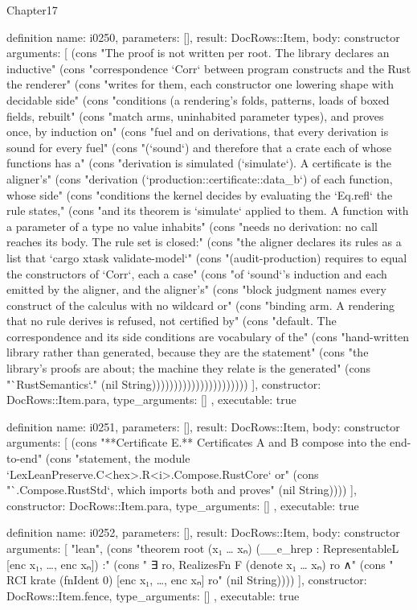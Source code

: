 \begin{lexlean}{Chapter17}
\begin{semanticmodule}
definition{
  name: i0250,
  parameters: [],
  result: DocRows::Item,
  body: constructor{
    arguments: [
      (cons "The proof is not written per root. The library declares an inductive" (cons "correspondence `Corr` between program constructs and the Rust the renderer" (cons "writes for them, each constructor one lowering shape with decidable side" (cons "conditions (a rendering's folds, patterns, loads of boxed fields, rebuilt" (cons "match arms, uninhabited parameter types), and proves once, by induction on" (cons "fuel and on derivations, that every derivation is sound for every fuel" (cons "(`sound`) and therefore that a crate each of whose functions has a" (cons "derivation is simulated (`simulate`). A certificate is the aligner's" (cons "derivation (`production::certificate::data_b`) of each function, whose side" (cons "conditions the kernel decides by evaluating the `Eq.refl` the rule states," (cons "and its theorem is `simulate` applied to them. A function with a parameter of a type no value inhabits" (cons "needs no derivation: no call reaches its body. The rule set is closed:" (cons "the aligner declares its rules as a list that `cargo xtask validate-model`" (cons "(audit-production) requires to equal the constructors of `Corr`, each a case" (cons "of `sound`'s induction and each emitted by the aligner, and the aligner's" (cons "block judgment names every construct of the calculus with no wildcard or" (cons "binding arm. A rendering that no rule derives is refused, not certified by" (cons "default. The correspondence and its side conditions are vocabulary of the" (cons "hand-written library rather than generated, because they are the statement" (cons "the library's proofs are about; the machine they relate is the generated" (cons "`RustSemantics`." (nil String))))))))))))))))))))))
    ],
    constructor: DocRows::Item.para,
    type_arguments: []
  },
  executable: true
}

definition{
  name: i0251,
  parameters: [],
  result: DocRows::Item,
  body: constructor{
    arguments: [
      (cons "**Certificate E.** Certificates A and B compose into the end-to-end" (cons "statement, the module `LexLeanPreserve.C<hex>.R<i>.Compose.RustCore` or" (cons "`.Compose.RustStd`, which imports both and proves" (nil String))))
    ],
    constructor: DocRows::Item.para,
    type_arguments: []
  },
  executable: true
}

definition{
  name: i0252,
  parameters: [],
  result: DocRows::Item,
  body: constructor{
    arguments: [
      "lean",
      (cons "theorem root (x₁ … xₙ) (__e_hrep : RepresentableL [enc x₁, …, enc xₙ]) :" (cons "    ∃ ro, RealizesFn F (denote x₁ … xₙ) ro ∧" (cons "      RCI krate (fnIdent 0) [enc x₁, …, enc xₙ] ro" (nil String))))
    ],
    constructor: DocRows::Item.fence,
    type_arguments: []
  },
  executable: true
}


\end{semanticmodule}
\end{lexlean}

